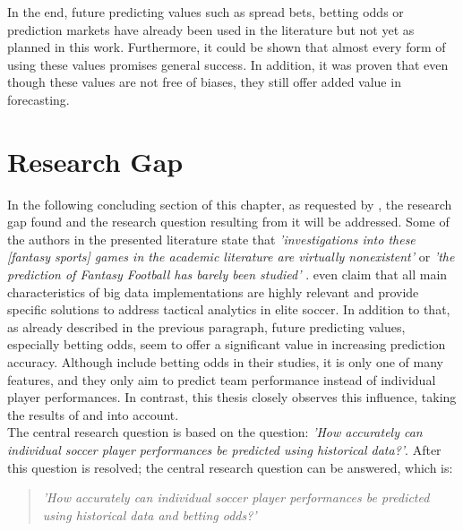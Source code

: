 \clearpage In the end, future predicting values such as spread bets, betting odds or prediction markets have already been used in the literature but not yet as planned in this work. Furthermore, it could be shown that almost every form of using these values promises general success. In addition, it was proven that even though these values are not free of biases, they still offer added value in forecasting.

\section{Research Gap}
In the following concluding section of this chapter, as requested by \citet{webster_guest_2002}, the research gap found and the research question resulting from it will be addressed. Some of the authors in the presented literature state that \emph{'investigations into these [fantasy sports] games in the academic literature are virtually nonexistent'} \parencite[, p. 1]{landers_machine_2017} or \emph{'the prediction of Fantasy Football has barely been studied'} \parencite[, p. 1]{lutz_fantasy_2015}. \citet{rein_big_2016} even claim that all main characteristics of big data implementations are highly relevant and provide specific solutions to address tactical analytics in elite soccer. In addition to that, as already described in the previous paragraph, future predicting values, especially betting odds, seem to offer a significant value in increasing prediction accuracy. Although \citet{deng_analysis_2020} include betting odds in their studies, it is only one of many features, and they only aim to predict team performance instead of individual player performances. In contrast, this thesis closely observes this influence, taking the results of \citet{wheatcroft_profiting_2020} and \citet{goldstein_wisdom_2014} into account. \\
The central research question is based on the question: \emph{'How accurately can individual soccer player performances be predicted using historical data?'}. After this question is resolved; the central research question can be answered, which is:
\begin{quote}
    \centering
    \emph{'How accurately can individual soccer player performances be predicted using historical data and betting odds?'}
    \label{research_question}
\end{quote}